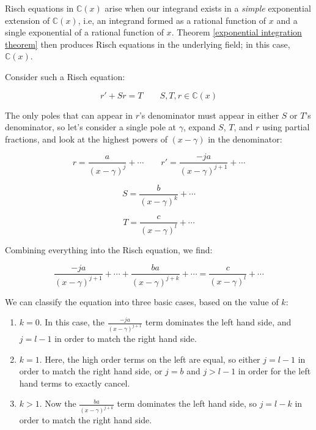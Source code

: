 Risch equations in ${\mathbb C}(x)$ arise when our integrand exists in
a {\it simple} exponential extension of ${\mathbb C}(x)$,
i.e, an integrand formed as a rational function of $x$ and a
single exponential of a rational function of $x$.  Theorem
\ref{exponential integration theorem}
then produces Risch equations in the underlying field;
in this case, ${\mathbb C}(x)$.

Consider such a Risch equation:

$$r' + S r = T \qquad S,T,r \in {\mathbb C}(x)$$

\begin{comment}
Recall that in ${\mathbb C}(x)$, irreducible factors in the
denominator always increase in degree on differentiation, so $A$'s
factors are the only factors that can appears in $q$'s denominator,
because they must cancel against $q'$.  Thus, we can easily identify
which irreducible factors can appear in $q$'s denominator, and we next
wish to calculate the multiplicities with which they appear.
\end{comment}

The only poles that can appear in $r$'s denominator must appear in
either $S$ or $T$'s denominator, so let's consider a single pole at
$\gamma$, expand $S$, $T$, and $r$ using partial fractions, and look
at the highest powers of $(x-\gamma)$ in the denominator:

$$r = \frac{a}{(x-\gamma)^j} + \cdots  \qquad  r' = \frac{-ja}{(x-\gamma)^{j+1}} + \cdots$$

$$S = \frac{b}{(x-\gamma)^k} + \cdots$$

$$T = \frac{c}{(x-\gamma)^l} + \cdots$$

Combining everything into the Risch equation, we find:

$$\frac{-ja}{(x-\gamma)^{j+1}} + \cdots + \frac{ba}{(x-\gamma)^{j+k}} + \cdots = \frac{c}{(x-\gamma)^l} + \cdots$$

We can classify the equation into three basic cases, based on the value of $k$:

\begin{enumerate}

\item $k=0$.  In this case, the $\frac{-ja}{(x-\gamma)^{j+1}}$ term dominates the left hand side,
and $j = l-1$ in order to match the right hand side.

\item $k=1$.  Here, the high order terms on the left are equal, so either $j=l-1$ in order to match
the right hand side, or $j=b$ and $j>l-1$ in order for the left hand terms to exactly cancel.

\item $k>1$.  Now the $\frac{ba}{(x-\gamma)^{j+k}}$ term dominates the left hand side, so $j=l-k$ in
order to match the right hand side.

\end{enumerate}

